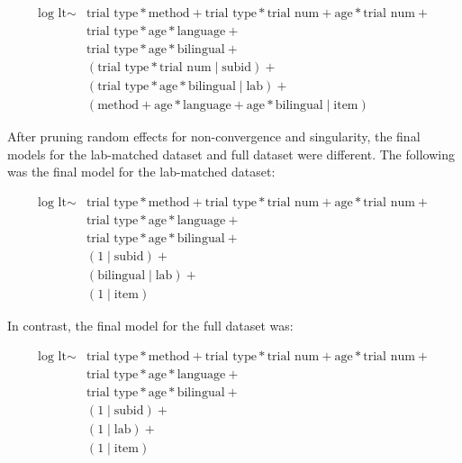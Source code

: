 \documentclass[
  english,
  ,man,floatsintext]{apa6}
\begin{document}
\begin{equation}
\begin{split}
\text{log lt} \sim & \text{trial type} * \text{method} + \text{trial type} * \text{trial num} + \text{age} * \text{trial num} + \\
& \text{trial type} * \text{age} * \text{language} + \\
& \text{trial type} * \text{age} * \text{bilingual} + \\
& (\text{trial type} * \text{trial num} \mid \text{subid}) + \\
& (\text{trial type} * \text{age} * \text{bilingual} \mid \text{lab}) + \\
& (\text{method} + \text{age} * \text{language} + \text{age} * \text{bilingual} \mid \text{item})
\end{split}
\end{equation}

After pruning random effects for non-convergence and singularity, the final models for the lab-matched dataset and full dataset were different. The following was the final model for the lab-matched dataset:

\begin{equation}
\begin{split}
\text{log lt} \sim & \text{trial type} * \text{method} + \text{trial type} * \text{trial num} + \text{age} * \text{trial num} + \\
& \text{trial type} * \text{age} * \text{language} + \\
& \text{trial type} * \text{age} * \text{bilingual} + \\
& (1 \mid \text{subid}) + \\
& (\text{bilingual} \mid \text{lab}) + \\
& (1 \mid \text{item})
\end{split}
\end{equation}

In contrast, the final model for the full dataset was:

\begin{equation}
\begin{split}
\text{log lt} \sim & \text{trial type} * \text{method} + \text{trial type} * \text{trial num} + \text{age} * \text{trial num} + \\
& \text{trial type} * \text{age} * \text{language} + \\
& \text{trial type} * \text{age} * \text{bilingual} + \\
& (1 \mid \text{subid}) + \\
& (1 \mid \text{lab}) + \\
& (1 \mid \text{item})
\end{split}
\end{equation}
\end{document}
